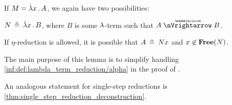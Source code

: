 \begin{lemma}
\begin{thmenum}
     If \( M = \qabs x A \), we again have two possibilities:
    \begin{thmenum}
       \( N \aequiv \qabs x B \), where \( B \) is some \( {\mathrm \lambda} \)-term such that \( A \ppred B \).

       If \( \eta \)-reduction is allowed, it is possible that \( A \aequiv Nx \) and \( x \not\in \op*{Free}(N) \).
    \end{thmenum}
  \end{thmenum}
\end{lemma}
\begin{comments}
  \item The main purpose of this lemma is to simplify handling \ref{inf:def:lambda_term_reduction/alpha} in the proof of .

  \item An analogous statement for single-step reductions is \cref{thm:single_step_reduction_deconstruction}.
\end{comments}
